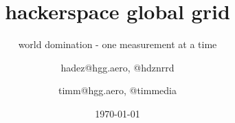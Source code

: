 




\usepackage{url}
%

\usepackage{listings}
  
\usepackage[utf8]{inputenc}
\usepackage[T1]{fontenc}
\usepackage{lmodern}
\usepackage[ngerman]{babel}

\usepackage{amsmath}

\usepackage{array}
\usepackage{longtable}
\usepackage{graphicx}
\graphicspath{{./pic/}}

\newcommand{\shack}{\includegraphics<.->[height=1em]{shack_brightbg}}
\newcommand{\hgg}{\includegraphics<.->[height=1em]{hgg_logo_rgb_pos}}


\date{\today}

 
\title{hackerspace global grid} 
\subtitle{world domination - one measurement at a time}
\author[hdz, Timm]{hadez@hgg.aero, @hdznrrd \and timm@hgg.aero, @timmedia}

\subject{SpaceUP Stuttgart 2012}

\titlegraphic{}


\AtBeginSection
{
  \begin{frame}
  \end{frame}
}

\AtBeginSubsection
{
  \begin{frame}
  \end{frame}
}







